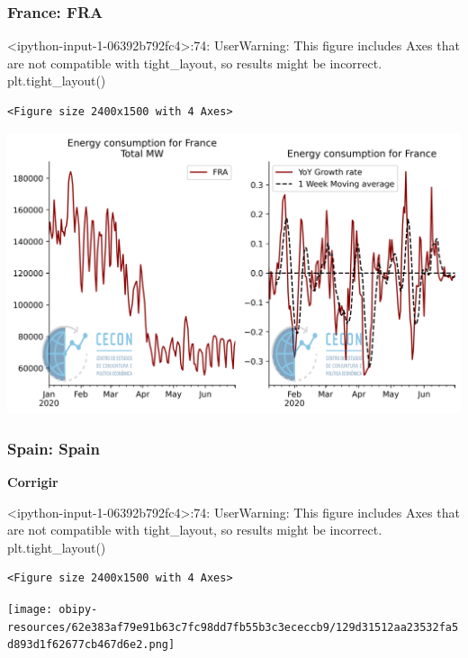 \documentclass[11pt]{article}
\begin{document}
\subsubsection{France: FRA}
\label{sec:org1261391}

<ipython-input-1-06392b792fc4>:74: UserWarning: This figure includes Axes that are not compatible with tight\_layout, so results might be incorrect.
  plt.tight\_layout()

\begin{verbatim}
<Figure size 2400x1500 with 4 Axes>
\end{verbatim}


\begin{center}
\includegraphics[width=.9\linewidth]{obipy-resources/62e383af79e91b63c7fc98dd7fb55b3c3ececcb9/325746abff053090d5f6fe9490ccdb4ba397472d.png}
\end{center}

\subsubsection{Spain: Spain}
\label{sec:org7a03652}

\textbf{Corrigir}

<ipython-input-1-06392b792fc4>:74: UserWarning: This figure includes Axes that are not compatible with tight\_layout, so results might be incorrect.
  plt.tight\_layout()

\begin{verbatim}
<Figure size 2400x1500 with 4 Axes>
\end{verbatim}


\begin{center}
\texttt{[image: obipy-resources/62e383af79e91b63c7fc98dd7fb55b3c3ececcb9/129d31512aa23532fa5d893d1f62677cb467d6e2.png]}
\end{center}
\end{document}
